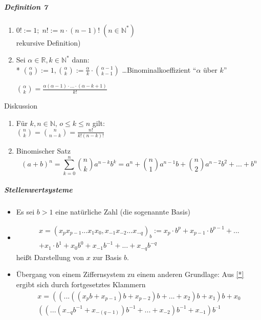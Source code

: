 \documentclass[a4paper]{scrartcl}
\begin{document}
\subparagraph{Definition 7}
\begin{enumerate}
\item $0! :=1; \; n!:= n\cdot (n-1)! \; (n\in \mathbb{N}^*)$\\
rekursive Definition)
\item Sei $\alpha \in \mathbb{R}, k\in \mathbb{N}^*$ dann:\\*
$\binom{\alpha}{0} :=1, \binom{\alpha}{k} := \frac{\alpha}{k} \cdot \binom{\alpha -1}{k-1}$ \dots Binominalkoeffizient "`$\alpha$ über $k$"'

$\binom{\alpha}{k} = \frac{\alpha (\alpha -1) \cdot ... \cdot (\alpha -k +1)}{k!}$
\end{enumerate}

Diskussion
\begin{enumerate}
\item Für $k,n \in \mathbb{N}, \, o\leq k \leq n$ gilt:\\
$\binom{n}{k}=\binom{n}{n-k} = \frac{n!}{k!(n-k)!}$
\item Binomischer Satz
\[(a+b)^n = \sum\limits_{k=0}^{n} \binom{n}{k} a^{n-k} b^k = a^n + \binom{n}{1} a^{n-1} b + \binom{n}{2} a^{n-2} b^2 + ... + b^n\]
\end{enumerate}
\subparagraph{Stellenwertsysteme}
\begin{itemize}
\item Es sei $b>1$ eine natürliche Zahl (die sogenannte Basis)
\item \begin{equation} \label{*} \begin{split}x=(x_p x_{p-1} ... x_1 x_0, x_{-1} x_{-2} ... x_{-q})_b:=
x_p \cdot b^p + x_{p-1} \cdot b^{p-1} + ... \\ + x_1 \cdot b^1 + x_0b^0 + x_{-1} b ^{-1} + ... + x_{-q} b^{-q}\end{split}\end{equation} heißt Darstellung von $x$ zur Basis $b$.
\item Übergang von einem Ziffernsystem zu einem anderen Grundlage: Aus \ref{*} ergibt sich durch fortgesetztes Klammern 
\begin{equation} \label{**}\begin{split}
x=((...((x_pb + x_{p-1}) b + x_{p-2})b+...+ x_2)b +x_1)b + x_0\\ ((...(x_{-q}b^{-1} + x_{-(q-1)})b^{-1} + ... + x_{-2})b^{-1} + x_{-1})b^{–1}\end{split}\end{equation}
\end{itemize}
\end{document}
